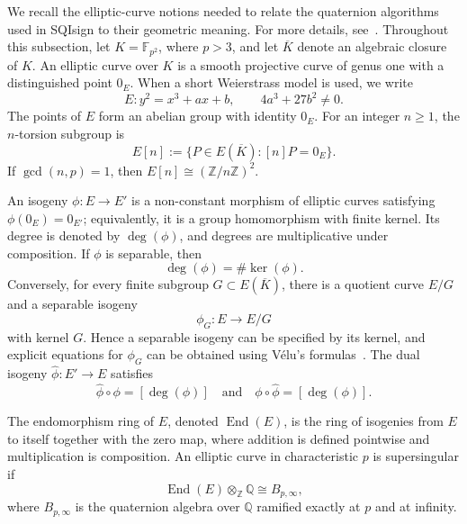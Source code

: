 We recall the elliptic-curve notions needed to relate the quaternion algorithms used in SQIsign to their geometric meaning.
For more details, see~\cite{Sil09,De17}.
Throughout this subsection, let \(K=\mathbb{F}_{p^2}\), where \(p>3\), and let \(\overline{K}\) denote an algebraic closure of \(K\).
An elliptic curve over \(K\) is a smooth projective curve of genus one with a distinguished point \(0_E\).
When a short Weierstrass model is used, we write
\[
    E : y^2 = x^3 + ax + b,
    \qquad 4a^3+27b^2 \neq 0.
\]
The points of \(E\) form an abelian group with identity \(0_E\).
For an integer \(n\geq 1\), the \(n\)-torsion subgroup is
\[
    E[n] := \{P\in E(\overline{K}) : [n]P = 0_E\}.
\]
If \(\gcd(n,p)=1\), then \(E[n]\cong (\mathbb{Z}/n\mathbb{Z})^2\).

An isogeny \(\phi:E\rightarrow E'\) is a non-constant morphism of elliptic
curves satisfying \(\phi(0_E)=0_{E'}\); equivalently, it is a group homomorphism
with finite kernel. Its degree is denoted by \(\deg(\phi)\), and degrees are
multiplicative under composition. If \(\phi\) is separable, then
\[
    \deg(\phi)=\#\ker(\phi).
\]
Conversely, for every finite subgroup \(G\subset E(\overline{K})\), there is a
quotient curve \(E/G\) and a separable isogeny
\[
    \phi_G:E\longrightarrow E/G
\]
with kernel \(G\). Hence a separable isogeny can be specified by its kernel,
and explicit equations for \(\phi_G\) can be obtained using V\'elu's formulas~\cite{Velu71}. The dual isogeny
\(\widehat{\phi}:E'\rightarrow E\) satisfies
\[
    \widehat{\phi}\circ \phi = [\deg(\phi)]
    \quad\text{and}\quad
    \phi\circ \widehat{\phi} = [\deg(\phi)].
\]

The endomorphism ring of \(E\), denoted \(\operatorname{End}(E)\), is the ring
of isogenies from \(E\) to itself together with the zero map, where addition is
defined pointwise and multiplication is composition. An elliptic curve in
characteristic \(p\) is supersingular if
\[
    \operatorname{End}(E)\otimes_{\mathbb{Z}}\mathbb{Q}
    \cong B_{p,\infty},
\]
where \(B_{p,\infty}\) is the quaternion algebra over \(\mathbb{Q}\) ramified
exactly at \(p\) and at infinity.

